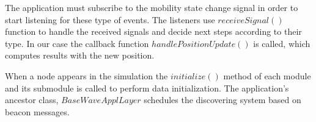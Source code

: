 The application must subscribe to the mobility state change signal in order
to start listening for these type of events. The listeners use $receiveSignal()$
function to handle the received signals and decide next steps according to their
type. In our case the callback function $handlePositionUpdate()$ is called, which
computes results with the new position.

When a node appears in the simulation the $initialize()$ method of each module
and its submodule is called to perform data initialization. The application's
ancestor class, $BaseWaveApplLayer$ schedules the discovering system based on
beacon messages.






